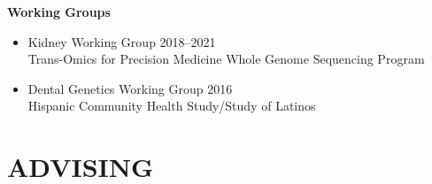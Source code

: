 \documentclass[margin]{res}
\begin{document}
\begin{resume}
\hspace{0.1cm}\textbf{Working Groups}
\begin{itemize} %
\item Kidney Working Group \hfill 2018--2021 \\ Trans-Omics for Precision Medicine Whole Genome Sequencing Program 
\item Dental Genetics Working Group \hfill 2016 \\ Hispanic Community Health Study/Study of Latinos \\
\end{itemize}
						


\section{ADVISING}	



\end{resume}
\end{document}
